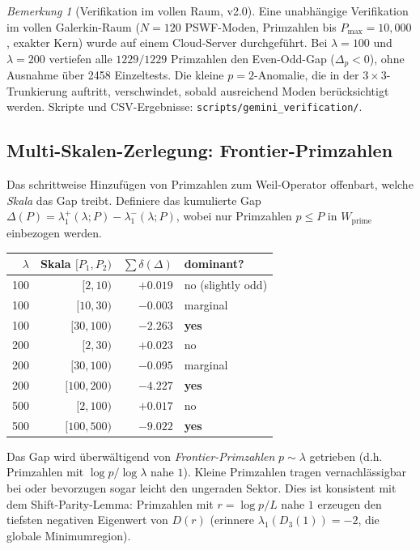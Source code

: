 ﻿\documentclass[12pt,a4paper]{article}
\theoremstyle{definition}
\theoremstyle{remark}
\newtheorem{remark}[theorem]{Bemerkung}
\begin{document}
\begin{remark}[Verifikation im vollen Raum, v2.0]
Eine unabhängige Verifikation im vollen Galerkin-Raum ($N = 120$ PSWF-Moden, Primzahlen bis $P_{\max} = 10{,}000$, exakter Kern) wurde auf einem Cloud-Server durchgeführt. Bei $\lambda = 100$ und $\lambda = 200$ vertiefen alle $1229/1229$ Primzahlen den Even-Odd-Gap ($\Delta_p < 0$), ohne Ausnahme über 2458 Einzeltests. Die kleine $p = 2$-Anomalie, die in der $3 \times 3$-Trunkierung auftritt, verschwindet, sobald ausreichend Moden berücksichtigt werden. Skripte und CSV-Ergebnisse: \texttt{scripts/gemini\_verification/}.
\end{remark}

\subsection{Multi-Skalen-Zerlegung: Frontier-Primzahlen}
\label{sec:frontier}

Das schrittweise Hinzufügen von Primzahlen zum Weil-Operator offenbart, welche \emph{Skala} das Gap treibt. Definiere das kumulierte Gap $\Delta(P) = \lambda_1^+(\lambda; P) - \lambda_1^-(\lambda; P)$, wobei nur Primzahlen $p \leq P$ in $W_{\mathrm{prime}}$ einbezogen werden.

\begin{center}
\renewcommand{\arraystretch}{1.15}
\begin{tabular}{r|r|r|l}
$\lambda$ & Skala $[P_1, P_2)$ & $\sum \delta(\Delta)$ & dominant? \\\hline
100 & $[2, 10)$ & $+0.019$ & no (slightly odd) \\
100 & $[10, 30)$ & $-0.003$ & marginal \\
100 & $[30, 100)$ & $-2.263$ & \textbf{yes} \\[3pt]
200 & $[2, 30)$ & $+0.023$ & no \\
200 & $[30, 100)$ & $-0.095$ & marginal \\
200 & $[100, 200)$ & $-4.227$ & \textbf{yes} \\[3pt]
500 & $[2, 100)$ & $+0.017$ & no \\
500 & $[100, 500)$ & $-9.022$ & \textbf{yes}
\end{tabular}
\end{center}

Das Gap wird überwältigend von \emph{Frontier-Primzahlen} $p \sim \lambda$ getrieben (d.h. Primzahlen mit $\log p / \log\lambda$ nahe $1$). Kleine Primzahlen tragen vernachlässigbar bei oder bevorzugen sogar leicht den ungeraden Sektor. Dies ist konsistent mit dem Shift-Parity-Lemma: Primzahlen mit $r = \log p / L$ nahe $1$ erzeugen den tiefsten negativen Eigenwert von $D(r)$ (erinnere $\lambda_1(D_3(1)) = -2$, die globale Minimumregion).
\end{document}
